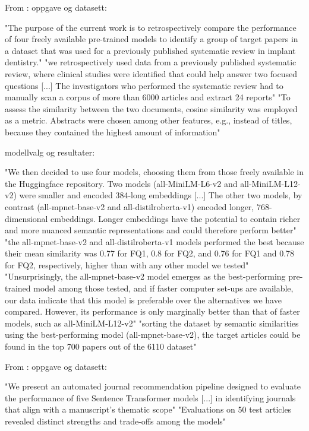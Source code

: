 From \parencite{galli2024performance_pre_trained_sentence_transformer_models} :
oppgave og datasett:

"The purpose of the current work is to retrospectively compare the performance of four freely available pre-trained models to identify a group of target papers in a dataset that was used for a previously published systematic review in implant dentistry."
"we retrospectively used data from a previously published systematic review, where clinical studies were identified that could help answer two focused questions [...] The investigators who performed the systematic review had to manually scan a corpus of more than 6000 articles and extract 24 reports"
"To assess the similarity between the two documents, cosine similarity was employed as a metric. Abstracts were chosen among other features, e.g., instead of titles, because they contained the highest amount of information"

modellvalg og resultater:

"We then decided to use four models, choosing them from those freely available in the Huggingface repository. Two models (all-MiniLM-L6-v2 and all-MiniLM-L12-v2) were smaller and encoded 384-long embeddings [...] The other two models, by contrast (all-mpnet-base-v2 and all-distilroberta-v1) encoded longer, 768-dimensional embeddings. Longer embeddings have the potential to contain richer and more nuanced semantic representations and could therefore perform better"
"the all-mpnet-base-v2 and all-distilroberta-v1 models performed the best because their mean similarity was 0.77 for FQ1, 0.8 for FQ2, and 0.76 for FQ1 and 0.78 for FQ2, respectively, higher than with any other model we tested"
"Unsurprisingly, the all-mpnet-base-v2 model emerges as the best-performing pre-trained model among those tested, and if faster computer set-ups are available, our data indicate that this model is preferable over the alternatives we have compared. However, its performance is only marginally better than that of faster models, such as all-MiniLM-L12-v2"
"sorting the dataset by semantic similarities using the best-performing model (all-mpnet-base-v2), the target articles could be found in the top 700 papers out of the 6110 dataset"

From \parencite{colangelo2025comparative_analysis_sentence_transformer_models} :
oppgave og datasett:

"We present an automated journal recommendation pipeline designed to evaluate the performance of five Sentence Transformer models [...] in identifying journals that align with a manuscript's thematic scope"
"Evaluations on 50 test articles revealed distinct strengths and trade-offs among the models"

